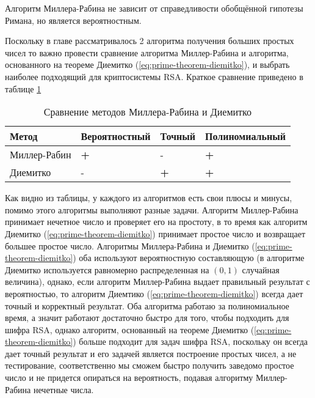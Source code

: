   Алгоритм Миллера-Рабина не зависит от справедливости обобщённой гипотезы Римана, но является вероятностным.

  Поскольку в главе рассматривалось 2 алгоритма получения больших простых чисел то важно провести сравнение алгоритма Миллер-Рабина и алгоритма, основанного на теореме Диемитко (\ref{eq:prime-theorem-diemitko}), и выбрать наиболее подходящий для криптосистемы RSA. Краткое сравнение приведено в таблице \ref{prime-compare-label}

  \begin{table}[h]
    \centering
    \begin{tabular}{|l|l|l|l|}   
        \hline 
        \textbf{Метод} & \textbf{Вероятностный} & \textbf{Точный} & \textbf{Полиномиальный} \\ \hline        
        Миллер-Рабин        & \textbf{+}           & -                & \textbf{+}              \\ \hline
        Диемитко            & -           & \textbf{+}                 & \textbf{+}              \\ \hline        
    \end{tabular} 
    \caption{Сравнение методов Миллера-Рабина и Диемитко}
    \label{prime-compare-label}
  \end{table}

  Как видно из таблицы, у каждого из алгоритмов есть свои плюсы и минусы, помимо этого алгоритмы выполняют разные задачи. Алгоритм Миллер-Рабина принимает нечетное число и проверяет его на простоту, в то время как алгоритм Диемитко (\ref{eq:prime-theorem-diemitko}) принимает простое число и возвращает большее простое число. Алгоритмы Миллера-Рабина и Диемитко (\ref{eq:prime-theorem-diemitko}) оба используют вероятностную составляющую (в алгоритме Диемитко используется равномерно распределенная на $(0,1)$ случайная величина), однако, если алгоритм Миллер-Рабина выдает правильный результат с вероятностью, то алгоритм Диемтико (\ref{eq:prime-theorem-diemitko}) всегда дает точный и корректный результат. Оба алгоритма работаю за полиномиальное время, а значит работают достаточно быстро для того, чтобы подходить для шифра RSA, однако алгоритм, основанный на теореме Диемитко (\ref{eq:prime-theorem-diemitko}) больше подходит для задач шифра RSA, поскольку он всегда дает точный результат и его задачей является построение простых чисел, а не тестирование, соответственно мы сможем быстро получить заведомо простое число и не придется опираться на вероятность, подавая алгоритму Миллер-Рабина нечетные числа.



